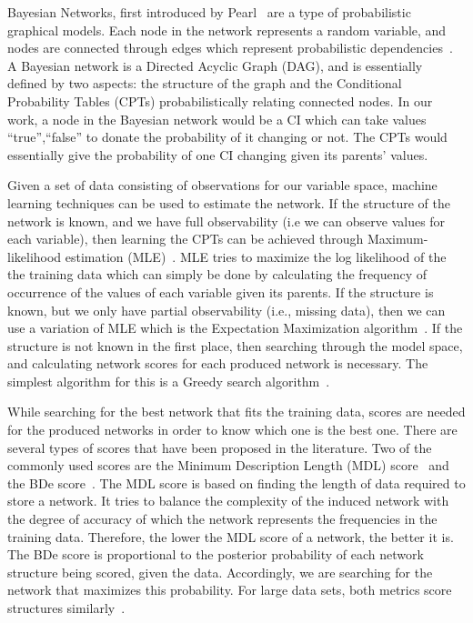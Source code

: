 \documentclass[10pt,twocolumn,letterpaper]{article}
\begin{document}
Bayesian Networks, first introduced by Pearl~\cite{pearl1988probabilistic} are a type of probabilistic graphical models. Each node in the network
represents a random
variable, and nodes are connected through edges which represent probabilistic dependencies~\cite{benbayesian}. A Bayesian network is a Directed
Acyclic Graph (DAG), and is essentially defined by two aspects: the structure of the graph and the Conditional Probability Tables (CPTs) probabilistically
relating connected nodes. In our work, a node in the Bayesian network would be a CI which can take values {``true'',``false''} to donate the probability of it
changing or not. The CPTs would essentially give the probability of one CI changing given its parents' values.

Given a set of data consisting of observations for our variable space, machine learning techniques can be used to estimate the network. If the structure of the
network is known, and we have full observability (i.e we can observe values for each variable), then learning the CPTs can be achieved through
Maximum-likelihood estimation (MLE)~\cite{benbayesian}. MLE tries to maximize the log likelihood of the the training data which can simply be done by
calculating the frequency of occurrence of the values of each variable given its parents. If the structure is known, but we only have partial observability
(i.e., missing data), then we can use a variation of MLE which is the Expectation Maximization algorithm~\cite{dempster1977maximum}. If the structure is not
known in
the first place, then searching through the model space, and calculating network scores for each produced network is necessary. The simplest algorithm for this
is a Greedy search algorithm~\cite{friedman1996learning}.

While searching for the best network that fits the training data, scores are needed for the produced networks in order to know which one is the best one. There
are several types of scores that have been proposed in the literature. Two of the commonly used scores are the Minimum Description Length (MDL)
score~\cite{rissanen1986stochastic} and the BDe score~\cite{heckerman1995learning}. The MDL score is based on finding the length of data required to store a
network. It tries to balance the complexity of the induced network with the degree of accuracy of which the network represents the frequencies in the training
data. Therefore, the lower the MDL score of a network, the better it is. The BDe score is proportional to the posterior probability of each network structure
being scored, given the data. Accordingly, we are searching for the network that maximizes this probability. For large data sets, both metrics score
structures similarly~\cite{friedman1996learning}. 
\end{document}
